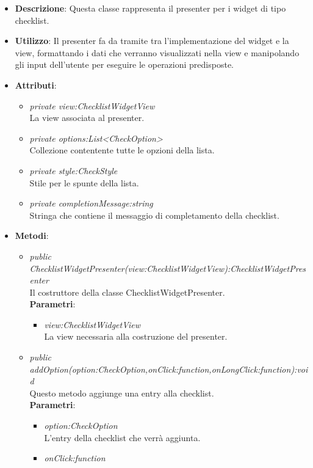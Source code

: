 \begin{itemize}
\item \textbf{Descrizione}: Questa classe rappresenta il presenter per i widget di tipo checklist.
\item \textbf{Utilizzo}: Il presenter fa da tramite tra l'implementazione del widget e la view, formattando i dati che verranno visualizzati nella view e manipolando gli input dell'utente per eseguire le operazioni predisposte.
\item \textbf{Attributi}:
	\begin{itemize}
	\item \textit{private view:ChecklistWidgetView}\\
	La view associata al presenter.
	\item \textit{private options:List<CheckOption>}\\
	Collezione contentente tutte le opzioni della lista.
	\item \textit{private style:CheckStyle}\\
	Stile per le spunte della lista.
	\item \textit{private completionMessage:string}\\
	Stringa che contiene il messaggio di completamento della checklist.
	\end{itemize}
\item \textbf{Metodi}:
	\begin{itemize}
	\item \textit{public ChecklistWidgetPresenter(view:ChecklistWidgetView):ChecklistWidgetPresenter}\\
	Il costruttore della classe ChecklistWidgetPresenter.
		\\ \textbf{Parametri}: \begin{itemize}
		\item \textit{view:ChecklistWidgetView}\\
		La view necessaria alla costruzione del presenter.
		\end{itemize} 
	\item \textit{public addOption(option:CheckOption,onClick:function,onLongClick:function):void}\\
	Questo metodo aggiunge una entry alla checklist.
		\\ \textbf{Parametri}: \begin{itemize}
		\item \textit{option:CheckOption}\\
		L'entry della checklist che verrà aggiunta.
		\item \textit{onClick:function}\\

\end{itemize}
\end{itemize}
\end{itemize}
